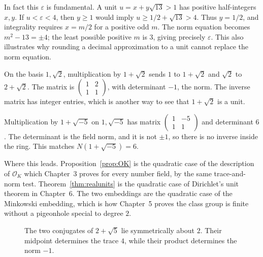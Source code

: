 In fact this $\varepsilon$ is fundamental. A unit $u=x+y\sqrt{13}>1$
has positive half-integers $x,y$. If $u<\varepsilon<4$, then
$y\ge1$ would imply $u\ge1/2+\sqrt{13}>4$.
Thus $y=1/2$, and integrality requires $x=m/2$ for a positive odd $m$.
The norm equation becomes $m^2-13=\pm4$; the least possible positive $m$
is $3$, giving precisely $\varepsilon$. This also illustrates why
rounding a decimal approximation to a unit cannot replace the norm equation.

\begin{examplex}
On the basis $1,\sqrt 2$, multiplication by $1+\sqrt 2$ sends $1$ to $1+\sqrt 2$ and $\sqrt 2$ to $2+\sqrt 2$. The matrix is $\begin{pmatrix}1&2\\1&1\end{pmatrix}$, with determinant $-1$, the norm. The inverse matrix has integer entries, which is another way to see that $1+\sqrt 2$ is a unit.
\end{examplex}

\begin{examplex}
Multiplication by $1+\sqrt{-5}$ on $1,\sqrt{-5}$ has matrix $\begin{pmatrix}1&-5\\1&1\end{pmatrix}$ and determinant $6$. The determinant is the field norm, and it is not $\pm 1$, so there is no inverse inside the ring. This matches $N(1+\sqrt{-5})=6$.
\end{examplex}

\begin{beauty}
Where this leads. Proposition~\ref{prop:OK} is the quadratic case of the description of $\mathcal O_K$ which Chapter~3 proves for every number field, by the same trace-and-norm test. Theorem~\ref{thm:realunits} is the quadratic case of Dirichlet's unit theorem in Chapter~6. The two embeddings are the quadratic case of the Minkowski embedding, which is how Chapter~5 proves the class group is finite without a pigeonhole special to degree $2$.
\end{beauty}

\begin{figure}[ht]
\centering
{}
\caption{The two conjugates of $2+\sqrt5$ lie symmetrically about $2$. Their midpoint determines the trace $4$, while their product determines the norm $-1$.}
\label{fig:v13-extra-01-a}
\end{figure}

